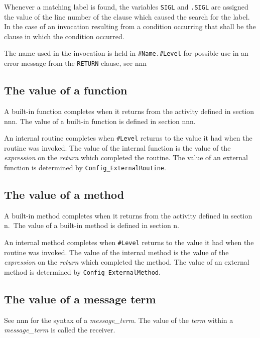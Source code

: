 Whenever a matching label is found, the variables \texttt{SIGL} and
\texttt{.SIGL} are assigned the value of the line number of the clause
which caused the search for the label. In the case of an invocation
resulting from a condition occurring that shall be the clause in which
the condition occurred.



The name used in the invocation is held in \texttt{\#Name.\#Level} for
possible use in an error message from the \texttt{RETURN} clause, see
nnn

\subsection{The value of a function}\label{the-value-of-a-function}

A built-in function completes when it returns from the activity defined
in section nnn. The value of a built-in function is defined in section
nnn.

An internal routine completes when \texttt{\#Level} returns to the value
it had when the routine was invoked. The value of the internal function
is the value of the \emph{expression} on the \emph{return} which
completed the routine. The value of an external function is determined
by \texttt{Config\_ExternalRoutine}.

\subsection{The value of a method}\label{the-value-of-a-method}

A built-in method completes when it returns from the activity defined in
section n.~The value of a built-in method is defined in section n.

An internal method completes when \texttt{\#Level} returns to the value
it had when the routine was invoked. The value of the internal method is
the value of the \emph{expression} on the \emph{return} which completed
the method. The value of an external method is determined by
\texttt{Config\_ExternalMethod}.

\subsection{The value of a message
term}\label{the-value-of-a-message-term}

See nnn for the syntax of a \emph{message\_term}. The value of the
\emph{term} within a \emph{message\_term} is called the receiver.

